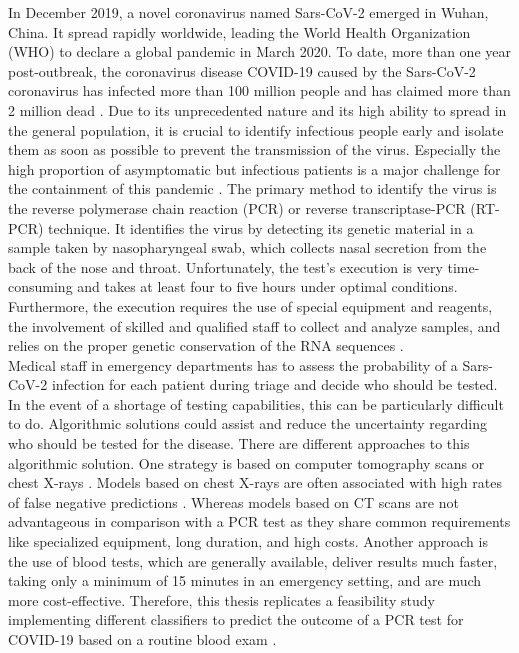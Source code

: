 In December 2019, a novel coronavirus named Sars-CoV-2 emerged in Wuhan, China. 
It spread rapidly worldwide, leading the World Health Organization (WHO) 
to declare a global pandemic in March 2020. To date, more than one year 
post-outbreak, the coronavirus disease COVID-19 caused by the Sars-CoV-2 
coronavirus has infected more than 100 million people and has claimed more than 
2 million dead \cite{RN204}. Due to its unprecedented nature and its high 
ability to spread in the general population, it is crucial to identify 
infectious people early and isolate them as soon as possible to 
prevent the transmission of the virus. 
Especially the high proportion of asymptomatic but infectious patients is a 
major challenge for the containment of this pandemic \cite{RN205}. The primary 
method to identify the virus is the reverse polymerase chain reaction (PCR) or 
reverse transcriptase-PCR (RT-PCR) technique. It identifies the virus by 
detecting its genetic material in a sample taken by nasopharyngeal swab, which 
collects nasal secretion from the back of the nose and throat. Unfortunately, 
the test's execution is very time-consuming and takes at least four to five 
hours under optimal conditions. 
Furthermore, the execution requires the use of special equipment and reagents, 
the involvement of skilled and qualified staff to collect and analyze samples, 
and relies on the proper genetic conservation of the RNA sequences 
\cite{RN201, RN202}.
\\
Medical staff in emergency departments has to assess the probability of a 
Sars-CoV-2 infection for each patient during triage and decide 
who should be tested. In the event of a shortage of testing capabilities, this 
can be particularly difficult to do. Algorithmic solutions could assist and 
reduce the uncertainty regarding who should be tested for the 
disease. There are different approaches to this algorithmic solution.
One strategy is based on computer tomography scans or chest X-rays 
\cite{RN200}. Models based on chest X-rays are often associated with high rates 
of false negative predictions \cite{RN200, RN206}. Whereas models based on CT 
scans are not advantageous in comparison with a PCR test as they share common 
requirements like specialized equipment, long duration, and high costs.
Another approach is the use of blood tests, which are generally available, 
deliver results much faster, taking only a minimum of 15 minutes in an 
emergency setting, and are much more cost-effective.
Therefore, this thesis replicates a feasibility study implementing different 
classifiers to predict the outcome of a PCR test for COVID-19 based on a 
routine blood exam \cite{RN127}.
